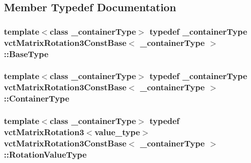 \subsection{Member Typedef Documentation}
\hypertarget{classvct_matrix_rotation3_const_base_a1f40b2353fc88d70bf853d4557eaae99}{
\subsubsection[{Base\-Type}]{\setlength{\rightskip}{0pt plus 5cm}template$<$class \-\_\-container\-Type$>$ typedef \-\_\-container\-Type {\bf vct\-Matrix\-Rotation3\-Const\-Base}$<$ \-\_\-container\-Type $>$\-::{\bf Base\-Type}}}\label{classvct_matrix_rotation3_const_base_a1f40b2353fc88d70bf853d4557eaae99}
\hypertarget{classvct_matrix_rotation3_const_base_a59e670b3a79131c32fa5ce28a9275509}{
\subsubsection[{Container\-Type}]{\setlength{\rightskip}{0pt plus 5cm}template$<$class \-\_\-container\-Type$>$ typedef \-\_\-container\-Type {\bf vct\-Matrix\-Rotation3\-Const\-Base}$<$ \-\_\-container\-Type $>$\-::{\bf Container\-Type}}}\label{classvct_matrix_rotation3_const_base_a59e670b3a79131c32fa5ce28a9275509}
\hypertarget{classvct_matrix_rotation3_const_base_a913ecee79856db867ac6d45d27cfe362}{
\subsubsection[{Rotation\-Value\-Type}]{\setlength{\rightskip}{0pt plus 5cm}template$<$class \-\_\-container\-Type$>$ typedef {\bf vct\-Matrix\-Rotation3}$<$value\-\_\-type$>$ {\bf vct\-Matrix\-Rotation3\-Const\-Base}$<$ \-\_\-container\-Type $>$\-::{\bf Rotation\-Value\-Type}}}\label{classvct_matrix_rotation3_const_base_a913ecee79856db867ac6d45d27cfe362}
